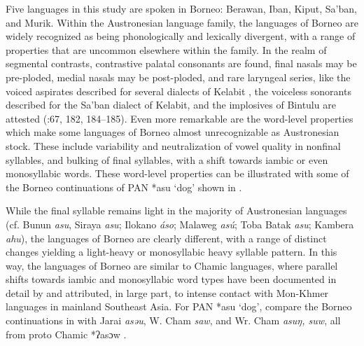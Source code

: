 \documentclass[output=paper]{langscibook}
\begin{document}
\hspace*{-2.5pt}Five languages in this study are spoken in Borneo: Berawan, Iban, Kiput, Sa’ban, and Murik. Within the Austronesian language family, the languages of Borneo are widely recognized as being phonologically and lexically divergent, with a range of properties that are uncommon elsewhere within the family. In the realm of segmental contrasts, contrastive palatal consonants are found, final nasals may be pre-ploded, medial nasals may be post-ploded, and rare laryngeal series, like the voiced aspirates described for several dialects of Kelabit \citep{Blust2006}, the voiceless sonorants described for the Sa’ban dialect of Kelabit, and the implosives of Bintulu are attested (\citealt{Blust2013}:67, 182, 184--185). Even more remarkable are the word-level properties which make some languages of Borneo almost unrecognizable as Austronesian stock. These include variability and neutralization of vowel quality in nonfinal syllables, and bulking of final syllables, with a shift towards iambic or even monosyllabic words. These word-level properties can be illustrated with some of the Borneo continuations of PAN *asu ‘dog’ shown in .

While the final syllable remains light in the majority of Austronesian languages (cf. Bunun \textit{asu}, Siraya \textit{asu}; Ilokano \textit{áso}; Malaweg \textit{asú}; Toba Batak \textit{asu}; Kambera \textit{ahu}), the languages of Borneo are clearly different, with a range of distinct changes yielding a light-heavy or monosyllabic heavy syllable pattern. In this way, the languages of Borneo are similar to Chamic languages, where parallel shifts towards iambic and monosyllabic word types have been documented in detail by \citet{Thurgood1999} and attributed, in large part, to intense contact with Mon-Khmer languages in mainland Southeast Asia. For PAN *asu ‘dog’, compare the Borneo continuations in  with Jarai \textit{asəu}, W. Cham \textit{saw}, and Wr. Cham \textit{asuŋ, suw}, all from proto Chamic *ʔasɔw \citep[281]{Thurgood1999}.
\end{document}

